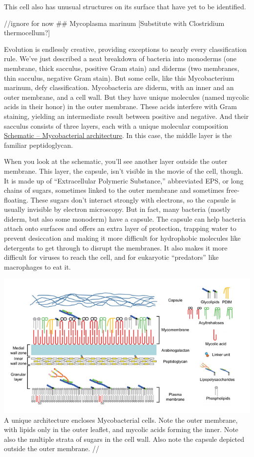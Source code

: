 \documentclass[]{book}
\begin{document}
This cell also has unusual structures on its surface that have yet to be
identified.

//ignore for now \#\# Mycoplasma marinum {[}Substitute with Clostridium
thermocellum?{]}

Evolution is endlessly creative, providing exceptions to nearly every
classification rule. We've just described a neat breakdown of bacteria
into monoderms (one membrane, thick sacculus, positive Gram stain) and
diderms (two membranes, thin sacculus, negative Gram stain). But some
cells, like this Mycobacterium marinum, defy classification.
Mycobacteria are diderm, with an inner and an outer membrane, and a cell
wall. But they have unique molecules (named mycolic acids in their
honor) in the outer membrane. These acids interfere with Gram staining,
yielding an intermediate result between positive and negative. And their
sacculus consists of three layers, each with a unique molecular
composition \protect\hyperlink{fig:2-5-1}{Schematic -- Mycobacterial
architecture}. In this case, the middle layer is the familiar
peptidoglycan.

When you look at the schematic, you'll see another layer outside the
outer membrane. This layer, the capsule, isn't visible in the movie of
the cell, though. It is made up of ``Extracellular Polymeric
Substance,'' abbreviated EPS, or long chains of sugars, sometimes linked
to the outer membrane and sometimes free-floating. These sugars don't
interact strongly with electrons, so the capsule is usually invisible by
electron microscopy. But in fact, many bacteria (mostly diderm, but also
some monoderm) have a capsule. The capsule can help bacteria attach onto
surfaces and offers an extra layer of protection, trapping water to
prevent desiccation and making it more difficult for hydrophobic
molecules like detergents to get through to disrupt the membranes. It
also makes it more difficult for viruses to reach the cell, and for
eukaryotic ``predators'' like macrophages to eat it.

\includegraphics{img/02_schematic/2_5_1_Mycobacteria.png} A unique
architecture encloses Mycobacterial cells. Note the outer membrane, with
lipids only in the outer leaflet, and mycolic acids forming the inner.
Note also the multiple strata of sugars in the cell wall. Also note the
capsule depicted outside the outer membrane. //
\end{document}
